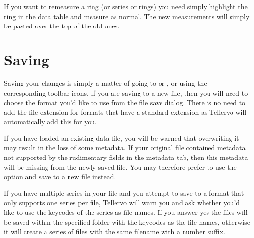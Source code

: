 If you want to remeasure a ring (or series or rings) you need simply highlight the ring in the data table and measure as normal.  The new measurements will simply be pasted over the top of the old ones.

\section{Saving}

Saving your changes is simply a matter of going to  or , or using the corresponding toolbar icons.  If you are saving to a new file, then you will need to choose the format you'd like to use from the file save dialog.  There is no need to add the file extension for formats that have a standard extension as Tellervo will automatically add this for you.

If you have loaded an existing data file, you will be warned that overwriting it may result in the loss of some metadata.  If your original file contained metadata not supported by the rudimentary fields in the metadata tab, then this metadata will be missing from the newly saved file.  You may therefore prefer to use the  option and save to a new file instead.

If you have multiple series in your file and you attempt to save to a format that only supports one series per file, Tellervo will warn you and ask whether you'd like to use the keycodes of the series as file names.  If you answer yes the files will be saved within the specified folder with the keycodes as the file names, otherwise it will create a series of files with the same filename with a number suffix.




